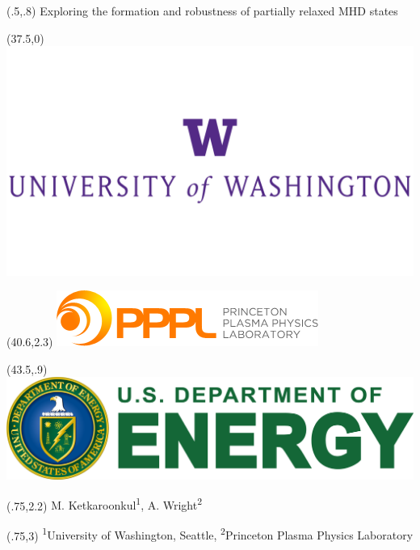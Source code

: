 \documentclass{beamer}
\begin{document}
\begin{frame}[t]
\begin{textblock}{30}(.5,.8)
\fontsize{72}{60}\selectfont Exploring the formation and robustness of partially relaxed MHD states
\end{textblock}
\begin{textblock}{24}(37.5,0)
\includegraphics[scale=.1]{uofwa.png}
\end{textblock}
\begin{textblock}{24}(40.6,2.3)
\includegraphics[scale=1]{pppl.png}
\end{textblock}
\begin{textblock}{24}(43.5,.9)
\includegraphics[scale=.1]{doe_logo.png}\break
\end{textblock}



\begin{textblock}{28}(.75,2.2)
{\huge
    M. Ketkaroonkul\textsuperscript{1},
    A. Wright\textsuperscript{2}
}
\end{textblock}
\begin{textblock}{24}(.75,3)
{\large
    \textsuperscript{1}University of Washington, Seattle,
    \textsuperscript{2}Princeton Plasma Physics Laboratory
}
\end{textblock}


\end{frame}
\end{document}
